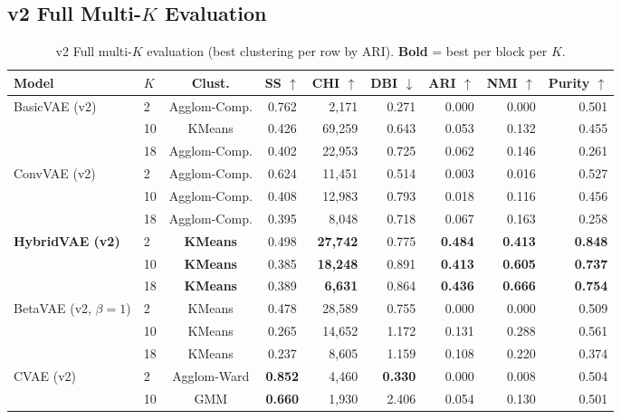 \documentclass{article}
\begin{document}
\subsection{v2 Full Multi-$K$ Evaluation}

\begin{table}[H]
\centering
\caption{v2 Full multi-$K$ evaluation (best clustering per row by ARI).
\textbf{Bold} = best per block per $K$.}
\label{tab:v2_multik}
\small
\begin{tabular}{llccrrrrr}
\toprule
\textbf{Model} & \textbf{$K$} & \textbf{Clust.} & \textbf{SS $\uparrow$} &
\textbf{CHI $\uparrow$} & \textbf{DBI $\downarrow$} & \textbf{ARI $\uparrow$} &
\textbf{NMI $\uparrow$} & \textbf{Purity $\uparrow$} \\
\midrule
\multirow{3}{*}{BasicVAE (v2)}
 & 2  & Agglom-Comp. & 0.762 &  2,171 & 0.271 & 0.000 & 0.000 & 0.501 \\
 & 10 & KMeans       & 0.426 & 69,259 & 0.643 & 0.053 & 0.132 & 0.455 \\
 & 18 & Agglom-Comp. & 0.402 & 22,953 & 0.725 & 0.062 & 0.146 & 0.261 \\
\midrule
\multirow{3}{*}{ConvVAE (v2)}
 & 2  & Agglom-Comp. & 0.624 & 11,451 & 0.514 & 0.003 & 0.016 & 0.527 \\
 & 10 & Agglom-Comp. & 0.408 & 12,983 & 0.793 & 0.018 & 0.116 & 0.456 \\
 & 18 & Agglom-Comp. & 0.395 &  8,048 & 0.718 & 0.067 & 0.163 & 0.258 \\
\midrule
\multirow{3}{*}{\textbf{HybridVAE (v2)}}
 & 2  & \textbf{KMeans} & 0.498 & \textbf{27,742} & 0.775 & \textbf{0.484} & \textbf{0.413} & \textbf{0.848} \\
 & 10 & \textbf{KMeans} & 0.385 & \textbf{18,248} & 0.891 & \textbf{0.413} & \textbf{0.605} & \textbf{0.737} \\
 & 18 & \textbf{KMeans} & 0.389 &  \textbf{6,631} & 0.864 & \textbf{0.436} & \textbf{0.666} & \textbf{0.754} \\
\midrule
\multirow{3}{*}{BetaVAE (v2, $\beta\!=\!1$)}
 & 2  & KMeans & 0.478 & 28,589 & 0.755 & 0.000 & 0.000 & 0.509 \\
 & 10 & KMeans & 0.265 & 14,652 & 1.172 & 0.131 & 0.288 & 0.561 \\
 & 18 & KMeans & 0.237 &  8,605 & 1.159 & 0.108 & 0.220 & 0.374 \\
\midrule
\multirow{3}{*}{CVAE (v2)}
 & 2  & Agglom-Ward & \textbf{0.852} & 4,460 & \textbf{0.330} & 0.000 & 0.008 & 0.504 \\
 & 10 & GMM         & \textbf{0.660} & 1,930 & 2.406          & 0.054 & 0.130 & 0.501 \\

\end{tabular}
\end{table}
\end{document}
